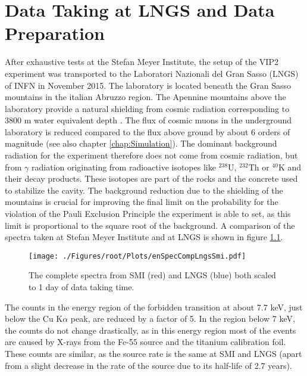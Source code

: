 \chapter{Data Taking at LNGS and Data Preparation}
\label{chap:DataAnalysis1}

After exhaustive tests at the Stefan Meyer Institute, the setup of the VIP2 experiment was transported to the Laboratori Nazionali del Gran Sasso (LNGS) of INFN in November 2015. The laboratory is located beneath the Gran Sasso mountains in the italian Abruzzo region. The Apennine mountains above the laboratory provide a natural shielding from cosmic radiation corresponding to 3800 m water equivalent depth \cite{Bellini2013}. The flux of cosmic muons in the underground laboratory is reduced compared to the flux above ground by about 6 orders of magnitude (see also chapter \ref{chap:Simulation}). The dominant background radiation for the experiment therefore does not come from cosmic radiation, but from $\gamma$ radiation originating from radioactive isotopes like $^{238}$U, $^{232}$Th or $^{40}$K and their decay products. These isotopes are part of the rocks and the concrete used to stabilize the cavity. The background reduction due to the shielding of the mountains is crucial for improving the final limit on the probability for the violation of the Pauli Exclusion Principle the experiment is able to set, as this limit is proportional to the square root of the background. A comparison of the spectra taken at Stefan Meyer Institute and at LNGS is shown in figure \ref{fig:enSpecSmiLngs}.
\begin{figure}[h]
 \centering
 \texttt{[image: ./Figures/root/Plots/enSpecCompLngsSmi.pdf]}
 \caption{The complete spectra from SMI (red) and LNGS (blue) both scaled to 1 day of data taking time.}
 \label{fig:enSpecSmiLngs}
\end{figure}
The counts in the energy region of the forbidden transition at about 7.7 keV, just below the Cu K$\alpha$ peak, are reduced by a factor of 5. In the region below 7 keV, the counts do not change drastically, as in this energy region most of the events are caused by X-rays from the Fe-55 source and the titanium calibration foil. These counts are similar, as the source rate is the same at SMI and LNGS (apart from a slight decrease in the rate of the source due to its half-life of 2.7 years). 

